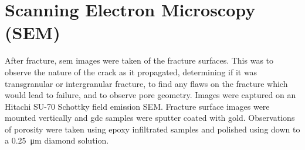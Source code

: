 \section{Scanning Electron Microscopy (SEM)}
    After fracture, \gls{sem} images were taken of the fracture surfaces.
    This was to observe the nature of the crack as it propagated, determining if it was transgranular or intergranular fracture, to find any flaws on the fracture which would lead to failure, and to observe pore geometry.
    Images were captured on an Hitachi SU-70 Schottky field emission SEM.
    Fracture surface images were mounted vertically and \gls{gdc} samples were sputter coated with gold.
    Observations of porosity were taken using epoxy infiltrated samples and polished using down to a \SI{0.25}{\micro\meter} diamond solution.
